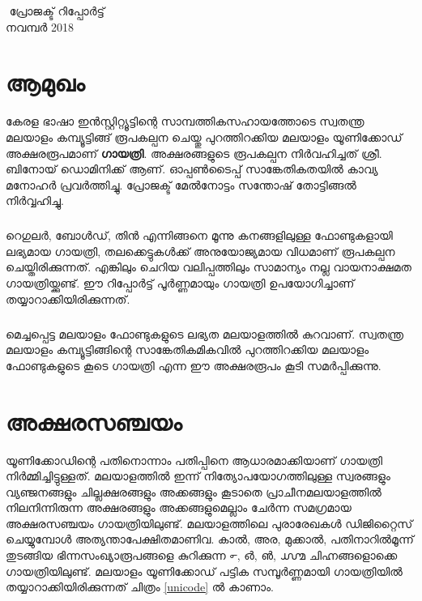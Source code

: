 \documentclass[12pt]{report}
\begin{document}
	
\begin{titlepage}
\BgThispage
\centering
\vfill
{{\Large { ‌ }}}
\vfill
{{\Large {പ്രോജക്ട് റിപ്പോർട്ട് }}}\\[.5cm]
{{\Large {നവമ്പർ 2018}}}\\
\end{titlepage}
 

\thispagestyle{empty}	
\clearpage
	
	\chapter*{ആമുഖം}
	

	കേരള ഭാഷാ ഇന്‍സ്റ്റിറ്റ്യൂട്ടിന്റെ സാമ്പത്തികസഹായത്തോടെ സ്വതന്ത്ര മലയാളം കമ്പ്യൂട്ടിങ്ങ് രൂപകല്പന ചെയ്തു പുറത്തിറക്കിയ മലയാളം യൂണിക്കോഡ് അക്ഷരരൂപമാണ്  \textbf{ഗായത്രി}. അക്ഷരങ്ങളുടെ  രൂപകല്പന നിർവഹിച്ചത് ശ്രീ. ബിനോയ് ഡൊമിനിക്ക് ആണ്. ഓപ്പണ്‍ടൈപ്പ് സാങ്കേതികതയിൽ കാവ്യ മനോഹർ പ്രവർത്തിച്ചു. പ്രോജക്ട് മേല്‍നോട്ടം സന്തോഷ് തോട്ടിങ്ങൽ നിർവ്വഹിച്ചു.
	
	\paragraph{}
	റെഗുലര്‍, ബോള്‍ഡ്, തിന്‍ എന്നിങ്ങനെ മൂന്നു കനങ്ങളിലുള്ള ഫോണ്ടുകളായി ലഭ്യമായ ഗായത്രി, തലക്കെട്ടുകള്‍ക്ക് അനുയോജ്യമായ വിധമാണ് രൂപകല്പന ചെയ്തിരിക്കുന്നത്. എങ്കിലും ചെറിയ വലിപ്പത്തിലും സാമാന്യം നല്ല വായനാക്ഷമത ഗായത്രിയ്ക്കുണ്ട്. ഈ റിപ്പോര്‍ട്ട് പൂര്‍ണ്ണമായും ഗായത്രി  ഉപയോഗിച്ചാണ് തയ്യാറാക്കിയിരിക്കുന്നത്.
	\paragraph{}
	മെച്ചപ്പെട്ട മലയാളം ഫോണ്ടുകളുടെ ലഭ്യത മലയാളത്തിൽ കുറവാണ്. സ്വതന്ത്ര മലയാളം കമ്പ്യൂട്ടിങ്ങിന്റെ സാങ്കേതികമികവിൽ പുറത്തിറക്കിയ  മലയാളം ഫോണ്ടുകളുടെ കൂടെ ഗായത്രി എന്ന ഈ അക്ഷരരൂപം കൂടി സമർപ്പിക്കുന്നു.
\thispagestyle{empty}
\clearpage
	\chapter*{ അക്ഷരസഞ്ചയം}
	

	
	യൂണിക്കോഡിന്റെ പതിനൊന്നാം പതിപ്പിനെ ആധാരമാക്കിയാണ് ഗായത്രി നിര്‍മ്മിച്ചിട്ടുള്ളത്. മലയാളത്തില്‍ ഇന്ന് നിത്യോപയോഗത്തിലുള്ള സ്വരങ്ങളും വ്യഞ്ജനങ്ങളും ചില്ലക്ഷരങ്ങളും അക്കങ്ങളും കൂടാതെ പ്രാചീനമലയാളത്തില്‍ നിലനിന്നിരുന്ന അക്ഷരങ്ങളും അക്കങ്ങളുമെല്ലാം ചേര്‍ന്ന സമഗ്രമായ അക്ഷരസഞ്ചയം ഗായത്രിയിലുണ്ട്. മലയാളത്തിലെ പുരാരേഖകള്‍ ഡിജിറ്റൈസ് ചെയ്യുമ്പോള്‍ അത്യന്താപേക്ഷിതമാണിവ. കാല്‍, അര, മുക്കാല്‍, പതിനാറില്‍മൂന്ന് തുടങ്ങിയ ഭിന്നസംഖ്യാരൂപങ്ങളെ കുറിക്കുന്ന ൳, ൴, ൵, ൸ ചിഹ്നങ്ങളൊക്കെ ഗായത്രിയിലുണ്ട്. മലയാളം യൂണിക്കോഡ് പട്ടിക സമ്പൂർണ്ണമായി ഗായത്രിയിൽ തയ്യാറാക്കിയിരിക്കുന്നത് ചിത്രം \ref{unicode} ല്‍ കാണാം.
	
\end{document}
